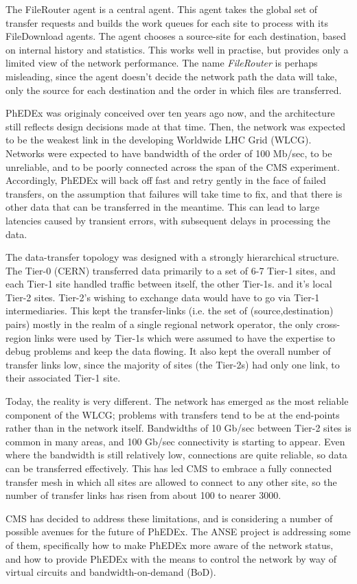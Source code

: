 The FileRouter agent is a central agent. This agent takes the global set of transfer requests and builds the work queues for each site to process with its FileDownload agents. The agent chooses a source-site for each destination, based on internal history and statistics. This works well in practise, but provides only a limited view of the network performance. The name \emph{FileRouter} is perhaps misleading, since the agent doesn't decide the network path the data will take, only the source for each destination and the order in which files are transferred.

PhEDEx was originaly conceived over ten years ago now, and the architecture still reflects design decisions made at that time. Then, the network was expected to be the weakest link in the developing Worldwide LHC Grid (WLCG)\cite{WLCG}. Networks were expected to have bandwidth of the order of 100 Mb/sec, to be unreliable, and to be poorly connected across the span of the CMS experiment. Accordingly, PhEDEx will back off fast and retry gently in the face of failed transfers, on the assumption that failures will take time to fix, and that there is other data that can be transferred in the meantime. This can lead to large latencies caused by transient errors, with subsequent delays in processing the data.

The data-transfer topology was designed with a strongly hierarchical structure. The Tier-0 (CERN) transferred data primarily to a set of 6-7 Tier-1 sites, and each Tier-1 site handled traffic between itself, the other Tier-1s. and it's local Tier-2 sites. Tier-2's wishing to exchange data would have to go via Tier-1 intermediaries. This kept the transfer-links (i.e. the set of (source,destination) pairs) mostly in the realm of a single regional network operator, the only cross-region links were used by Tier-1s which were assumed to have the expertise to debug problems and keep the data flowing. It also kept the overall number of transfer links low, since the majority of sites (the Tier-2s) had only one link, to their associated Tier-1 site.

Today, the reality is very different. The network has emerged as the most reliable component of the WLCG; problems with transfers tend to be at the end-points rather than in the network itself. Bandwidths of 10 Gb/sec between Tier-2 sites is common in many areas, and 100 Gb/sec connectivity is starting to appear. Even where the bandwidth is still relatively low, connections are quite reliable, so data can be transferred effectively. This has led CMS to embrace a fully connected transfer mesh in which all sites are allowed to connect to any other site, so the number of transfer links has risen from about 100 to nearer 3000.

CMS has decided to address these limitations, and is considering a number of possible avenues for the future of PhEDEx\cite{TW_DB_CHEP13}. The ANSE\cite{ANSE} project is addressing some of them, specifically how to make PhEDEx more aware of the network status, and how to provide PhEDEx with the means to control the network by way of virtual circuits and bandwidth-on-demand (BoD).